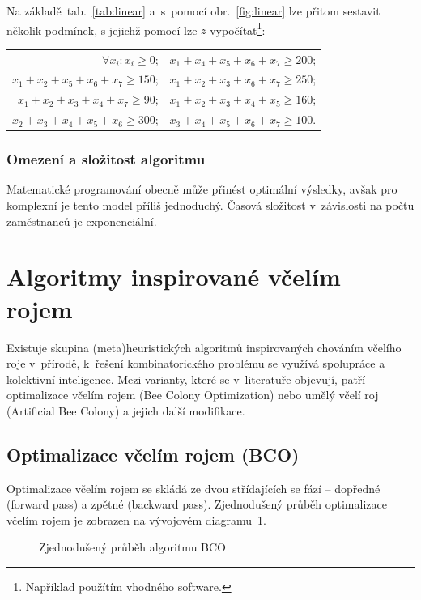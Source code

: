 \documentclass[twoside]{ctuthesis}
\begin{document}
Na základě~tab.~\ref{tab:linear} a~s~pomocí obr.~\ref{fig:linear} lze přitom sestavit několik podmínek, s jejichž pomocí lze $z$ vypočítat\footnote{Například použítím vhodného software.}:
\begin{center}
	\begin{tabular}{rl}
		$\forall x_i: x_i \geq 0$; & $x_1 + x_4 + x_5 + x_6 + x_7 \geq 200$; \\
		$x_1 + x_2 + x_5 + x_6 + x_7 \geq 150$; & $x_1 + x_2 + x_3 + x_6 + x_7 \geq 250$;\\
		$x_1 + x_2 + x_3 + x_4 + x_7 \geq 90$; & $x_1 + x_2 + x_3 + x_4 + x_5 \geq 160$; \\
		$x_2 + x_3 + x_4 + x_5 + x_6 \geq 300$; & $x_3 + x_4 + x_5 + x_6 + x_7 \geq 100$.
	\end{tabular}
\end{center}

\subsubsection{Omezení a složitost algoritmu}
Matematické programování obecně může přinést optimální výsledky, avšak pro komplexní je tento model příliš jednoduchý. \cite{burke2004state} Časová složitost v~závislosti na počtu zaměstnanců je exponenciální. \cite{chen2016comparison}


\newpage
\section{Algoritmy inspirované včelím rojem}
Existuje skupina (meta)heuristických algoritmů inspirovaných chováním včelího roje v~přírodě, k~řešení kombinatorického problému se využívá spolupráce a kolektivní inteligence. Mezi varianty, které se v~literatuře objevují, patří optimalizace včelím rojem (Bee Colony Optimization) nebo umělý včelí roj (Artificial Bee Colony) a jejich další modifikace.

\subsection{Optimalizace včelím rojem (BCO)}
Optimalizace včelím rojem se skládá ze dvou střídajících se fází -- dopředné (forward pass) a zpětné (backward pass). Zjednodušený průběh optimalizace včelím rojem je zobrazen na vývojovém diagramu~\ref{fig:bcoflow}.
\begin{figure}[h]
	
	\caption{Zjednodušený průběh algoritmu BCO}
	\label{fig:bcoflow}
\end{figure}
\end{document}
